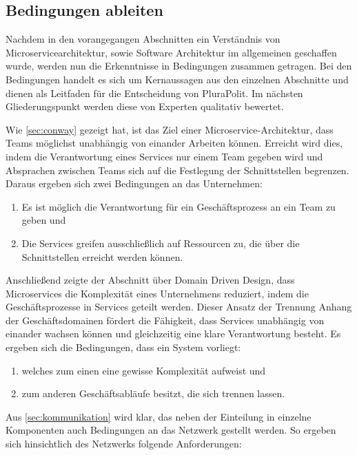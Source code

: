 \subsection{Bedingungen ableiten}

Nachdem in den vorangegangen Abschnitten ein Verständnis von Microservicearchitektur, sowie Software Architektur im allgemeinen geschaffen wurde, werden nun die Erkenntnisse in Bedingungen zusammen getragen. Bei den Bedingungen handelt es sich um Kernaussagen aus den einzelnen Abschnitte und dienen als Leitfaden für die Entscheidung von PluraPolit. Im nächsten Gliederungspunkt werden diese von Experten qualitativ bewertet.

Wie \cref{sec:conway} gezeigt hat, ist das Ziel einer Microservice-Architektur,  dass Teams möglichst unabhängig von einander Arbeiten können. Erreicht wird dies, indem die Verantwortung eines Services nur einem Team gegeben wird und Absprachen zwischen Teams sich auf die Festlegung der Schnittstellen begrenzen. Daraus ergeben sich zwei Bedingungen an das Unternehmen:

\begin{enumerate}
	\item Es ist möglich die Verantwortung für ein Geschäftsprozess an ein Team zu geben und
	\item Die Services greifen ausschließlich auf Ressourcen zu, die über die Schnittstellen erreicht werden können.
\end{enumerate}

Anschließend zeigte der Abschnitt über Domain Driven Design, dass Microservices die Komplexität eines Unternehmens reduziert, indem die Geschäftsprozesse in Services geteilt werden. Dieser Ansatz der Trennung Anhang der Geschäftsdomainen fördert die Fähigkeit, dass Services unabhängig von einander wachsen können und gleichzeitig eine klare Verantwortung besteht. Es ergeben sich die Bedingungen, dass ein System vorliegt:

\begin{enumerate}
	\item welches zum einen eine gewisse Komplexität aufweist und
	\item zum anderen Geschäftsabläufe besitzt, die sich trennen lassen.
\end{enumerate}

Aus \cref{sec:kommunikation} wird klar, das neben der Einteilung in einzelne Komponenten auch Bedingungen an das Netzwerk gestellt werden. So ergeben sich hinsichtlich des Netzwerks folgende Anforderungen:

